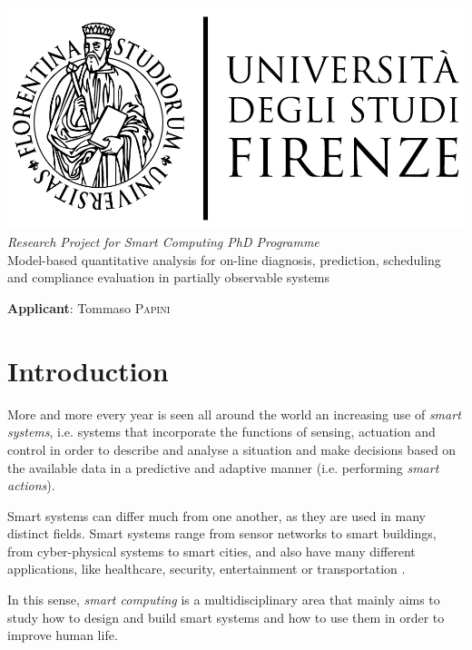 \documentclass{article}
\begin{document}
    
    \begin{center}
        \includegraphics[scale=0.2]{logo_unifi.jpg}\\[4cm]
        \textit{Research Project for Smart Computing PhD Programme}\\[0.3cm]
        {\Huge Model-based quantitative analysis for on-line diagnosis, prediction, scheduling and compliance evaluation in partially observable systems}
    \end{center}
    
    \vfill
    
    \textbf{Applicant}: Tommaso \textsc{Papini}
    
    \clearpage
    
    \section*{Introduction}
    
        More and more every year is seen all around the world an increasing use of \textit{smart systems}, i.e. systems that incorporate the functions of sensing, actuation and control in order to describe and analyse a situation and make decisions based on the available data in a predictive and adaptive manner (i.e. performing \textit{smart actions}).
        
        Smart systems can differ much from one another, as they are used in many distinct fields. Smart systems range from sensor networks to smart buildings, from cyber-physical systems to smart cities, and also have many different applications, like healthcare, security, entertainment or transportation \cite{akhras2000smart, smartcomp}.
        
        In this sense, \textit{smart computing} is a multidisciplinary area that mainly aims to study how to design and build smart systems and how to use them in order to improve human life.
        
\end{document}
